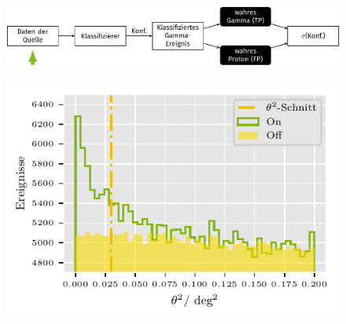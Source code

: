 \documentclass[aspectratio=1610, professionalfonts, 9pt]{beamer}
\begin{document}
\begin{frame}
  \begin{minipage}[t][0.25\textheight][t]{\textwidth}
	\begin{figure}
	  \includegraphics[scale=0.5]{./tikz/Conf/Conf1.pdf}
	\end{figure}
  \end{minipage}
  \begin{minipage}[t][0.75\textheight][t]{\textwidth}
	\begin{figure}
	  \centering
	  \includegraphics[height=0.7\textheight]{./Plots/on_off_ratio.pdf}
	\end{figure}
  \end{minipage}
\end{frame}
\end{document}
